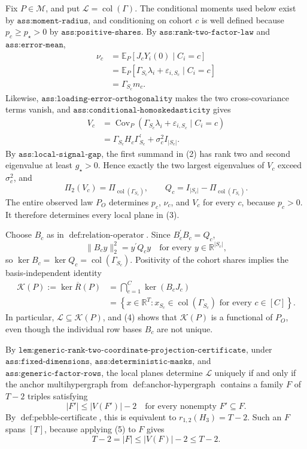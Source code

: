 Fix \(P\in\mathcal M\), and put \(\mathcal L=\operatorname{col}(\Gamma)\). The conditional moments used below exist by \(\texttt{ass:moment-radius}\), and conditioning on cohort \(c\) is well defined because \(p_c\geq p_\star>0\) by \(\texttt{ass:positive-shares}\). By \(\texttt{ass:rank-two-factor-law}\) and \(\texttt{ass:error-mean}\),
\[
\begin{aligned}
\nu_c
&=\mathbb E_P[J_cY_i(0)\mid C_i=c]\\
&=\mathbb E_P[\Gamma_{S_c}\lambda_i+\varepsilon_{i,S_c}\mid C_i=c]\\
&=\Gamma_{S_c}m_c.
\end{aligned}
\tag{1}
\]
Likewise, \(\texttt{ass:loading-error-orthogonality}\) makes the two cross-covariance terms vanish, and \(\texttt{ass:conditional-homoskedasticity}\) gives
\[
\begin{aligned}
V_c
&=\operatorname{Cov}_P(\Gamma_{S_c}\lambda_i+\varepsilon_{i,S_c}\mid C_i=c)\\
&=\Gamma_{S_c}H_c\Gamma_{S_c}^{\prime}+\sigma_c^2I_{|S_c|}.
\end{aligned}
\tag{2}
\]
By \(\texttt{ass:local-signal-gap}\), the first summand in (2) has rank two and second eigenvalue at least \(g_\star>0\). Hence exactly the two largest eigenvalues of \(V_c\) exceed \(\sigma_c^2\), and
\[
\Pi_2(V_c)=\Pi_{\operatorname{col}(\Gamma_{S_c})},
\qquad
Q_c=I_{|S_c|}-\Pi_{\operatorname{col}(\Gamma_{S_c})}.
\tag{3}
\]
The entire observed law \(P_O\) determines \(p_c\), \(\nu_c\), and \(V_c\) for every \(c\), because \(p_c>0\). It therefore determines every local plane in (3).

Choose \(B_c\) as in \(\operatorname{def:relation\text{-}operator}\). Since \(B_c^{\prime}B_c=Q_c\),
\[
\|B_cy\|_2^2=y^{\prime}Q_cy
\quad\text{for every }y\in\mathbb R^{|S_c|},
\]
so \(\ker B_c=\ker Q_c=\operatorname{col}(\Gamma_{S_c})\). Positivity of the cohort shares implies the basis-independent identity
\[
\begin{aligned}
\mathcal K(P):=\ker\overline R(P)
&=\bigcap_{c=1}^C\ker(B_cJ_c)\\
&=\left\{x\in\mathbb R^T:x_{S_c}\in
\operatorname{col}(\Gamma_{S_c})\text{ for every }c\in[C]\right\}.
\end{aligned}
\tag{4}
\]
In particular, \(\mathcal L\subseteq\mathcal K(P)\), and (4) shows that \(\mathcal K(P)\) is a functional of \(P_O\), even though the individual row bases \(B_c\) are not unique.

By \(\texttt{lem:generic-rank-two-coordinate-projection-certificate}\), under \(\texttt{ass:fixed-dimensions}\), \(\texttt{ass:deterministic-masks}\), and \(\texttt{ass:generic-factor-rows}\), the local planes determine \(\mathcal L\) uniquely if and only if the anchor multihypergraph from \(\operatorname{def:anchor\text{-}hypergraph}\) contains a family \(F\) of \(T-2\) triples satisfying
\[
|F'|\leq |V(F')|-2
\quad\text{for every nonempty }F'\subseteq F.
\tag{5}
\]
By \(\operatorname{def:pebble\text{-}certificate}\), this is equivalent to \(r_{1,2}(H_3)=T-2\). Such an \(F\) spans \([T]\), because applying (5) to \(F\) gives
\[
T-2=|F|\leq |V(F)|-2\leq T-2.
\]


